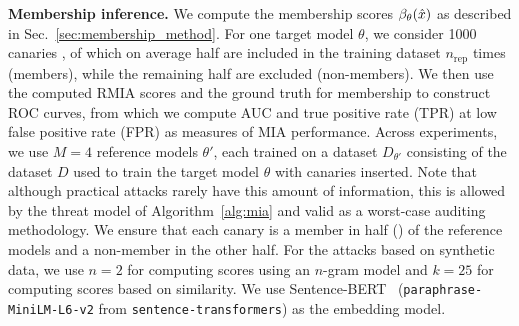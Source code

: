 \textbf{Membership inference.} 
We compute the membership scores $\beta_{\theta}({\hat{x}})$ as described in Sec.~\ref{sec:membership_method}. 
For one target model $\theta$, we consider \num{1000} canaries , of which on average half are included in the training dataset $n_\textrm{rep}$ times (members), while the remaining half are excluded (non-members).
%
We then use the computed RMIA scores and the ground truth for membership to construct ROC curves, from which we compute AUC and true positive rate (TPR) at low false positive rate (FPR) as measures of MIA performance.
%
Across experiments, we use $M = 4$ reference models $\theta'$, each trained on a dataset $D_{\theta'}$ consisting of the dataset $D$ used to train the target model $\theta$ with canaries inserted. Note that although practical attacks rarely have this amount of information, this is allowed by the threat model of Algorithm~\ref{alg:mia} and valid as a worst-case auditing methodology. 
%
We ensure that each canary is a member in half () of the reference models and a non-member in the other half. For the attacks based on synthetic data, we use $n=2$ for computing scores using an $n$-gram model and $k=25$ for computing scores based on similarity. We use Sentence-BERT~\citep{reimers-2019-sentence-bert} (\texttt{paraphrase-MiniLM-L6-v2} from \texttt{sentence-transformers}) as the embedding model. 
